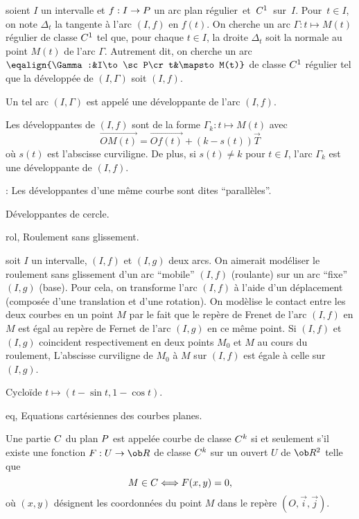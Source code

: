 soient $I$ un intervalle et $f:I\to\sc P$ 
un arc plan régulier~et~$\sc C^1$~sur~$I$. 
Pour~$t\in I$, on note $\Delta_t$ la tangente à l'arc $(I,f)$ en $f(t)$. 
On cherche un arc $\Gamma:t\mapsto M(t)$ régulier de classe $\sc C^1$ tel que, pour chaque $t\in I$, 
la droite $\Delta_t$ soit la normale au point $M(t)$ de l'arc $\Gamma$. 
Autrement dit, on cherche un arc $\eqalign{\Gamma:&I\to\sc P\cr t&\mapsto M(t)}$ 
de classe $\sc C^1$ régulier tel que la développée de $(I,\Gamma)$ soit $(I,f)$. 
\bigskip

\Definition Un tel arc $(I,\Gamma)$ est appelé une développante de l'arc $(I,f)$. 
\bigskip

Les développantes de $(I,f)$ sont de la forme $\Gamma_k:t\mapsto M(t)$ avec 
$$
\vec {OM(t)}=\vec{Of(t)}+(k-s(t))\vec T
$$ 
où $s(t)$ est l'abscisse curviligne. De plus, si $s(t)\neq k$ pour $t\in I$, 
l'arc $\Gamma_k$ est une développante de $(I,f)$. 

\Remarque : Les développantes d'une même courbe sont dites ``parallèles''. 
\bigskip

\centerline{%
}%
\Figure [Index=Courbes!Developpante@Développante!de cercle] Développantes de cercle.


\Subsection rol, Roulement sans glissement.
\bigskip

soit $I$ un intervalle, $(I,f)$ et $(I,g)$ deux arcs. 
On aimerait modéliser le roulement sans glissement d'un arc ``mobile'' $(I,f)$ (roulante)
sur un arc ``fixe'' $(I,g)$ (base). 
\bigskip
Pour cela, on transforme l'arc $(I,f)$ à l'aide d'un déplacement 
(composée d'une translation et d'une rotation). 
\medskip
On modèlise le contact entre les deux courbes en un point $M$ 
par le fait que le repère de Frenet de l'arc $(I,f)$ en $M$ 
est égal au repère de Fernet de l'arc $(I,g)$ en ce même point. 
\bigskip
Si $(I,f)$ et $(I,g)$ coincident respectivement en deux points $M_0$ et $M$ 
au cours du roulement, L'abscisse curviligne de $M_0$ à $M$ sur $(I,f)$ est égale à celle sur $(I,g)$. 
\bigskip

\centerline{%
}%
\Figure [Index=Courbes!Cycloide@Cycloïde] Cycloïde $t\mapsto(t-\sin t,1-\cos t)$.

\Subsection eq, Equations cartésiennes des courbes planes.
\bigskip

Une partie $\sc C$ du plan $\sc P$ est appelée courbe de classe $\sc C^k$ si  
et seulement s'il existe une fonction $F:U\to\ob R$ de classe $\sc C^k$ 
sur un ouvert $U$ de $\ob R^2$ telle que 
$$
M\in\sc C\Longleftrightarrow F(x,y)=0, 
$$
où $(x,y)$ désignent les coordonnées du point $M$ dans le repère $(O,\vec i,\vec j)$. 
\medskip


